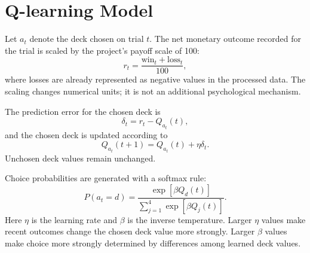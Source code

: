 \section{Q-learning Model}

Let \(a_t\) denote the deck chosen on trial \(t\). The net monetary outcome recorded for the trial is scaled by the project's payoff scale of 100:
\begin{equation}
    r_t=\frac{\mathrm{win}_t+\mathrm{loss}_t}{100},
\end{equation}
where losses are already represented as negative values in the processed data. The scaling changes numerical units; it is not an additional psychological mechanism.

The prediction error for the chosen deck is
\begin{equation}
    \delta_t=r_t-Q_{a_t}(t),
\end{equation}
and the chosen deck is updated according to
\begin{equation}
    Q_{a_t}(t+1)=Q_{a_t}(t)+\eta\delta_t.
\end{equation}
Unchosen deck values remain unchanged.

Choice probabilities are generated with a softmax rule:
\begin{equation}
    P(a_t=d)=\frac{\exp\left[\beta Q_d(t)\right]}{\sum_{j=1}^{4}\exp\left[\beta Q_j(t)\right]}.
\end{equation}
Here \(\eta\) is the learning rate and \(\beta\) is the inverse temperature. Larger \(\eta\) values make recent outcomes change the chosen deck value more strongly. Larger \(\beta\) values make choice more strongly determined by differences among learned deck values.
